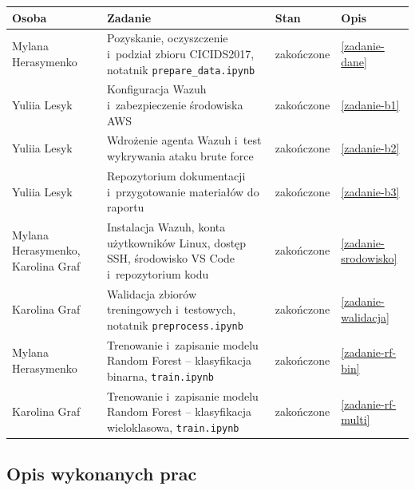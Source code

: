 \documentclass[11pt,a4paper,oneside]{article}
\newif\ifpodpowiedzi
\newcommand{\podpowiedz}[1]{\ifpodpowiedzi\par\begingroup\small\color{hintcolor}\textit{Wskazówka: #1}\par\endgroup\fi}
\newcommand{\studentA}{{Karolina Graf}}
\newcommand{\studentB}{{Yuliia Lesyk}}
\newcommand{\studentC}{{Mylana Herasymenko}}
\begin{document}
\begin{tabularx}{\textwidth}{@{}p{} Y p{0.15\textwidth} p{0.08\textwidth}@{}}
\toprule
Osoba & Zadanie & Stan & Opis\\
\midrule
\studentC & Pozyskanie, oczyszczenie i~podział zbioru CICIDS2017, notatnik \texttt{prepare\_data.ipynb} & zakończone & \ref{zadanie-dane}\\
\studentB & Konfiguracja Wazuh i~zabezpieczenie środowiska AWS & zakończone & \ref{zadanie-b1}\\
\studentB & Wdrożenie agenta Wazuh i~test wykrywania ataku brute force & zakończone & \ref{zadanie-b2}\\
\studentB & Repozytorium dokumentacji i~przygotowanie materiałów do raportu & zakończone & \ref{zadanie-b3}\\
\studentC, \studentA & Instalacja Wazuh, konta użytkowników Linux, dostęp SSH, środowisko VS Code i~repozytorium kodu & zakończone & \ref{zadanie-srodowisko}\\
\studentA & Walidacja zbiorów treningowych i~testowych, notatnik \texttt{preprocess.ipynb} & zakończone & \ref{zadanie-walidacja}\\
\studentC & Trenowanie i~zapisanie modelu Random Forest -- klasyfikacja binarna, \texttt{train.ipynb} & zakończone & \ref{zadanie-rf-bin}\\
\studentA & Trenowanie i~zapisanie modelu Random Forest -- klasyfikacja wieloklasowa, \texttt{train.ipynb} & zakończone & \ref{zadanie-rf-multi}\\
\bottomrule
\end{tabularx}

\newpage
\subsection{Opis wykonanych prac}
\podpowiedz{Dla każdego zadania podaj cel, wykonane czynności, konkretny rezultat i sposób jego sprawdzenia. Wskaż materiały potwierdzające prace, np. pliki, commity, zgłoszenia, zrzuty ekranu lub załączniki. Przy zadaniu w toku opisz, co już wykonano i co pozostało. Jeśli dana osoba nie wykonała prac w tym okresie, wskaż to wprost i wyjaśnij przyczynę.}

\end{document}
